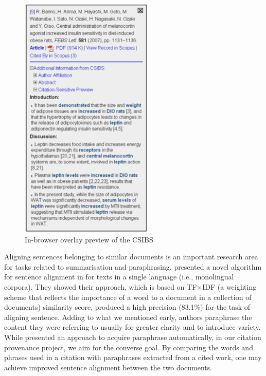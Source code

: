 \begin{figure}[h]
  \centering
  \includegraphics[scale=0.50]{./wanscreenshot}
  \caption{In-browser overlay preview of the CSIBS}
  \label{fig:wanscreenshot}
\end{figure}

Aligning sentences belonging to similar documents is an important research area for tasks related to summarisation and paraphrasing.  presented a novel algorithm for sentence alignment in for texts in a single language (i.e., monolingual corpora). They showed their approach, which is based on
TF$\times$IDF (a weighting scheme that reflects the importance of a word to a document in a collection of documents) similarity score, produced a high precision (83.1\%) for the task of aligning sentence.
Adding to what we mentioned early, authors paraphrase the content they were referring to usually for greater clarity and to introduce variety. While  presented an approach to acquire paraphrase automatically, in our citation provenance project, we aim for the converse goal. By comparing the words and phrases used in a citation with paraphrases extracted from a cited work, one may achieve improved sentence alignment between the two documents.